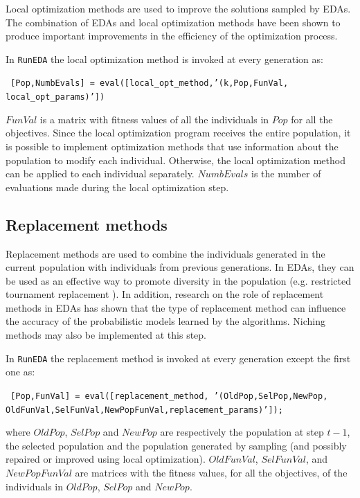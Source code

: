 \documentclass[a4paper]{article}
\begin{document}
Local optimization methods are used to improve the solutions sampled
by EDAs. The combination of EDAs and local optimization methods
\cite{Muehlenbein_and_Mahnig:2002,Pelikan_et_al:2002,Santana_et_al:2008f,Zhang_et_al:2005a}
have been shown to produce important improvements in the efficiency
of the optimization process.


In  \texttt{RunEDA} the local optimization method  is invoked at
every generation as:

  \texttt{  [Pop,NumbEvals] =  eval([local\_opt\_method,'(k,Pop,FunVal,\\
   local\_opt\_params)'])}

$FunVal$ is a matrix with fitness values of all the individuals in
$Pop$ for all the objectives. Since the local optimization program
receives the entire population, it is possible to implement
optimization methods that use information about the population to
modify each individual. Otherwise, the local optimization method can
be applied to each individual separately. $NumbEvals$ is the number
of evaluations made during the local optimization step.


\subsection{Replacement methods}

 Replacement methods are used to combine the individuals generated in the current
 population with individuals from previous generations. In EDAs, they can be
 used as an effective way to promote diversity in the population (e.g. restricted tournament
 replacement \cite{Pelikan:2005}). In addition, research on the role of replacement methods in
 EDAs \cite{Lima_et_al:2007} has shown
 that the type of replacement method can influence the accuracy of the
 probabilistic models learned by the algorithms.   Niching methods
 \cite{Mahfoud:1995} may also be implemented at this step.


In  \texttt{RunEDA} the replacement method  is invoked at every
generation except the first one as:

  \texttt{ [Pop,FunVal]  = eval([replacement\_method, '(OldPop,SelPop,NewPop,\\
   OldFunVal,SelFunVal,NewPopFunVal,replacement\_params)']); }

where $OldPop$, $SelPop$ and $NewPop$ are respectively the
population at step $t-1$, the selected population and the population
generated by sampling (and possibly repaired or improved using local
optimization). $OldFunVal$, $SelFunVal$, and $NewPopFunVal$ are
matrices with  the fitness values, for all the objectives, of the
individuals in $OldPop$, $SelPop$ and $NewPop$.
\end{document}
